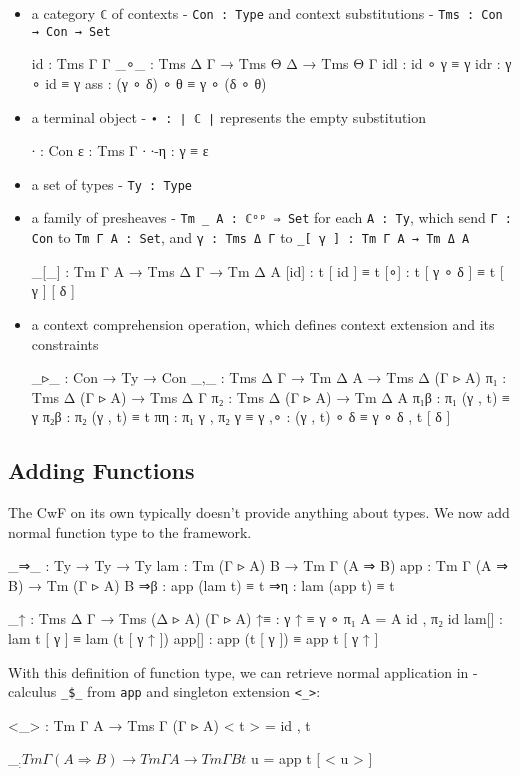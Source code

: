 \begin{itemize}
  \item{a category \texttt{ℂ} of contexts - \texttt{Con : Type} and context substitutions - \texttt{Tms : Con → Con → Set}}
  \begin{code}
    id   : Tms Γ Γ
    _∘_  : Tms Δ Γ → Tms Θ Δ → Tms Θ Γ
    idl  : id ∘ γ ≡ γ
    idr  : γ ∘ id ≡ γ
    ass  : (γ ∘ δ) ∘ θ ≡ γ ∘ (δ ∘ θ)
  \end{code}
  \item{a terminal object - \texttt{∙ : ∣ ℂ ∣} represents the empty substitution}
  \begin{code}
    ∙    : Con
    ε    : Tms Γ ∙
    ∙-η  : γ ≡ ε
  \end{code}
  \item{a set of types - \texttt{Ty : Type}}
  \item{a family of presheaves - \texttt{Tm \_ A : ℂᵒᵖ ⇒ Set} for each \texttt{A : Ty}, which send \texttt{Γ : Con} to \texttt{Tm Γ A : Set}, and \texttt{γ : Tms Δ Γ} to \texttt{\_[ γ ] : Tm Γ A → Tm Δ A}}
  \begin{code}
    _[_] : Tm Γ A → Tms Δ Γ → Tm Δ A
    [id] : t [ id ] ≡ t
    [∘] : t [ γ ∘ δ ] ≡ t [ γ ] [ δ ]
  \end{code}
  \item{a context comprehension operation, which defines context extension and its constraints}
  \begin{code}
    _▹_  : Con → Ty → Con
    _,_  : Tms Δ Γ → Tm Δ A → Tms Δ (Γ ▹ A)
    π₁   : Tms Δ (Γ ▹ A) → Tms Δ Γ
    π₂   : Tms Δ (Γ ▹ A) → Tm Δ A
    π₁β  : π₁ (γ , t) ≡ γ
    π₂β  : π₂ (γ , t) ≡ t
    πη   : π₁ γ , π₂ γ ≡ γ
    ,∘   : (γ , t) ∘ δ ≡ γ ∘ δ , t [ δ ]
  \end{code}
\end{itemize}

\subsection{Adding Functions}

The CwF on its own typically doesn't provide anything about types. We now add normal function type to the framework.

\begin{code}
    _⇒_  : Ty → Ty → Ty
    lam    : Tm (Γ ▹ A) B → Tm Γ (A ⇒ B)
    app   : Tm Γ (A ⇒ B) → Tm (Γ ▹ A) B
    ⇒β  : app (lam t) ≡ t  
    ⇒η  : lam (app t) ≡ t

    _↑ : Tms Δ Γ → Tms (Δ ▹ A) (Γ ▹ A)
    ↑≡  : γ ↑ ≡ γ ∘ π₁ {A = A} id , π₂ id
    lam[] : lam t [ γ ] ≡ lam (t [ γ ↑ ])
    app[] : app (t [ γ ]) ≡ app t [ γ ↑ ]
\end{code}

With this definition of function type, we can retrieve normal application in \lambda-calculus \texttt{\_\$\_} from \texttt{app} and singleton extension \texttt{<\_>}:

\begin{code}
<_> : Tm Γ A → Tms Γ (Γ ▹ A)
< t > = id , t

_$_ : Tm Γ (A ⇒ B) → Tm Γ A → Tm Γ B
t $ u = app t [ < u > ]
\end{code}
